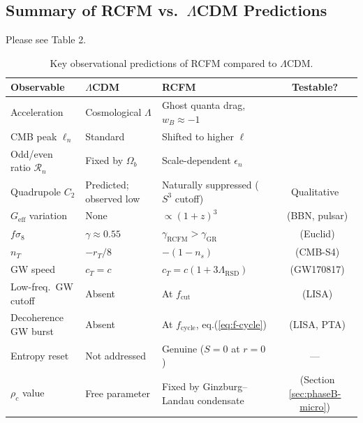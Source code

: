 \documentclass[10pt,twocolumn]{article}
\theoremstyle{definition}
\newcommand{\rhoc}{\rho_{c}}
\DeclareRobustCommand{\onecoltable}[2][]{%
  \begin{table}[#1]%
    \centering
    #2
  \end{table}%
}
\begin{document}
\subsection{Summary of RCFM vs.\ $\Lambda$CDM Predictions}  

Please see Table 2.

\onecoltable[htb]{%
 \centering
 \caption{Key observational predictions of RCFM compared to $\Lambda$CDM.}
  \label{tab:predictions}
  \begin{tabular}{p{2.8cm}p{3.5cm}p{3.5cm}c}
  \toprule
  Observable
    & $\Lambda$CDM
    & RCFM
    & Testable?\\
  \midrule
  Acceleration
    & Cosmological \( \Lambda \)
    & Ghost quanta drag, \( w_{B}\approx-1 \)
    & \checkmark\\
  CMB peak \( \ell_{n} \)
    & Standard
    & Shifted to higher \( \ell \)
    & \checkmark\\
  Odd/even ratio \( \mathcal{R}_{n} \)
    & Fixed by \( \Omega_{b} \)
    & Scale-dependent \( \epsilon_{n} \)
    & \checkmark\\
  Quadrupole \( C_{2} \)
    & Predicted; observed low
    & Naturally suppressed (\( S^{3} \) cutoff)
    & Qualitative\\
  \( G_{\mathrm{eff}} \) variation
    & None
    & \( \propto(1+z)^{3} \)
    & \checkmark\ (BBN, pulsar)\\
  \( f\sigma_{8} \)
    & \( \gamma\approx0.55 \)
    & \( \gamma_{\mathrm{RCFM}}>\gamma_{\mathrm{GR}} \)
    & \checkmark\ (Euclid)\\
  \( n_{T} \)
    & \( -r_{T}/8 \)
    & \( -(1-n_{s}) \)
    & \checkmark\ (CMB-S4)\\
  GW speed
    & \( c_{T}=c \)
    & \( c_{T}=c(1+3\Lambda_{\mathrm{RSD}}) \)
    & \checkmark\ (GW170817)\\
  Low-freq.\ GW cutoff
    & Absent
    & At \( f_{\mathrm{cut}} \)
    & \checkmark\ (LISA)\\
  Decoherence GW burst
    & Absent
    & At \( f_{\mathrm{cycle}} \), eq.\nobreakspace{}(\ref{eq:f-cycle})
    & \checkmark\ (LISA, PTA)\\
  Entropy reset
    & Not addressed
    & Genuine (\( S=0 \) at \( r=0 \))
    & ---\\
  \( \rhoc \) value
    & Free parameter
    & Fixed by Ginzburg--Landau condensate
    & \checkmark\ (Section \ref{sec:phaseB-micro})\\
  \bottomrule
  \end{tabular}
}
\end{document}
